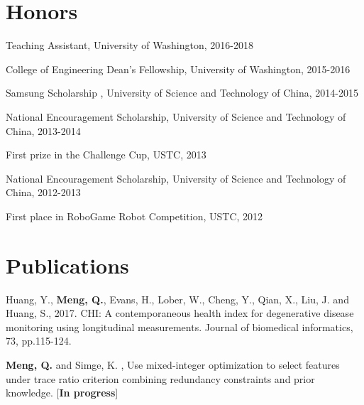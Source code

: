 \documentclass[margin,line]{resume}
\begin{document}
\begin{resume}

 
     


        \section{\mysidestyle Honors}
        \begin{list2}
        \item {Teaching Assistant, University of Washington, 2016-2018}
                \item {College of Engineering Dean's Fellowship, University of Washington, 2015-2016}          
        \item {Samsung Scholarship , University of Science and Technology of China, 2014-2015}
        \item {National Encouragement Scholarship, University of Science and Technology of China, 2013-2014}
        \item {First prize in the Challenge Cup, USTC, 2013}          
        \item {National Encouragement Scholarship, University of Science and Technology of China, 2012-2013}          
        \item {First place in RoboGame Robot Competition, USTC, 2012}
        \end{list2}

        \section{\mysidestyle Publications}
        Huang, Y., \textbf{Meng, Q.}, Evans, H., Lober, W., Cheng, Y., Qian, X., Liu, J. and Huang, S., 2017. CHI: A contemporaneous health index for degenerative disease monitoring using longitudinal measurements. Journal of biomedical informatics, 73, pp.115-124.\par
       \textbf{Meng, Q.} and Simge, K. , Use mixed-integer optimization to select features under trace ratio criterion combining redundancy constraints and prior knowledge. [\textbf{In progress}]
        

\end{resume}
\end{document}
